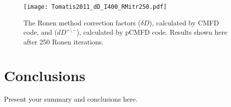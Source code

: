 \begin{figure}[!htbp]
	\centering
	\texttt{[image: Tomatis2011\_dD\_I400\_RMitr250.pdf]}
	\caption{The Ronen method correction factors ($\delta D$), calculated by CMFD code, and ($dD^{+\setminus -}$), calculated by pCMFD code. Results shown here after 250 Ronen iterations.}
	\label{fig:slab-RM-dD}
\end{figure}







\section{Conclusions}
\label{sec:conc}

Present your summary and conclusions here.

%
